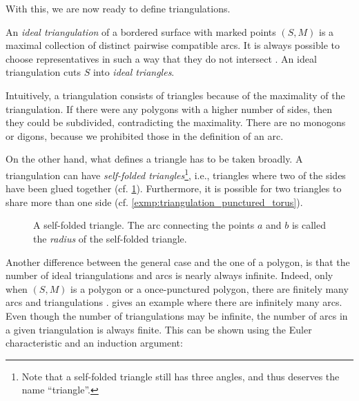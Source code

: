 With this, we are now ready to define triangulations.

\begin{definition}

	An \emph{ideal triangulation} of a bordered surface with
	marked points $(S, M)$ is a maximal collection of distinct pairwise compatible arcs. It
	is always possible to choose representatives in such a way that they do not intersect \parencite[Proposition 2.5]{FominShapiroThurston2008CATriangulatedSurfacesI}. An ideal
	triangulation cuts $S$ into \emph{ideal triangles}.
\end{definition}

Intuitively, a triangulation consists of triangles because of the maximality of the
triangulation. If there were any polygons with a higher number of sides, then they
could be subdivided, contradicting the maximality. There are no monogons or digons,
because we prohibited those in the definition of an arc.

On the other hand, what defines a triangle has to be taken broadly. A triangulation can
have \emph{self-folded triangles}\footnote{Note that a
	self-folded triangle still has three angles, and thus deserves the name ``triangle''.},
i.e., triangles where two of the sides have been glued together (cf.
\cref{fig:self_folded}). Furthermore, it is possible for two triangles to share more
than one side (cf. \cref{exmp:triangulation_punctured_torus}).
\begin{figure}[ht!]
	\centering


	\caption{A self-folded triangle. The arc connecting the points $a$ and $b$ is called the \emph{radius} of the self-folded triangle.}
	\label{fig:self_folded}
\end{figure}

Another difference between the general case and the one of a polygon, is that the
number of ideal triangulations and arcs is nearly always infinite. Indeed, only when
$(S, M)$ is a polygon or a once-punctured polygon, there are finitely many arcs and
triangulations \parencite[Proposition 2.3]{FominShapiroThurston2008CATriangulatedSurfacesI}.
 gives an example where there are infinitely many arcs. Even
though the number of triangulations may be infinite, the number of arcs in a given
triangulation is always finite. This can be shown using the Euler characteristic and an
induction argument:

